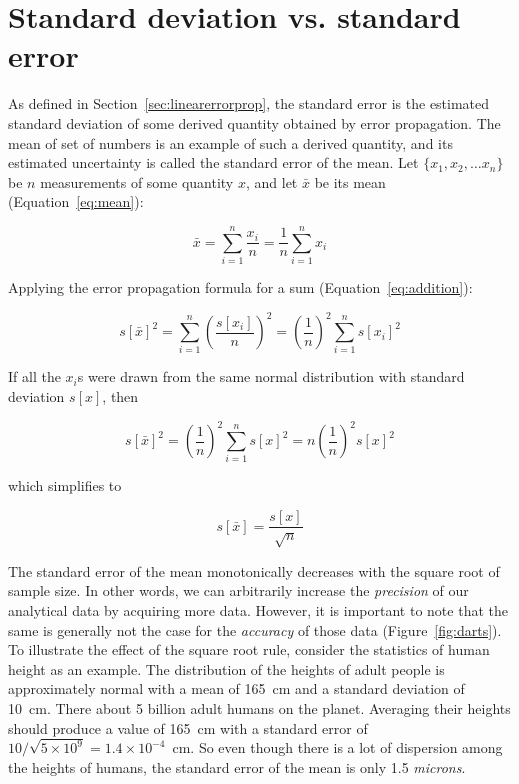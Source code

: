 \section{Standard deviation vs. standard error}
\label{sec:stderr}

As defined in Section~\ref{sec:linearerrorprop}, the standard error is
the estimated standard deviation of some derived quantity obtained by
error propagation. The mean of set of numbers is an example of such a
derived quantity, and its estimated uncertainty is called the standard
error of the mean.  Let $\{x_1,x_2, \ldots x_n\}$ be $n$ measurements
of some quantity $x$, and let $\bar{x}$ be its mean
(Equation~\ref{eq:mean}):

\[
\bar{x} = \sum\limits_{i=1}^n \frac{x_i}{n} = \frac{1}{n} \sum\limits_{i=1}^n x_i
\]

Applying the error propagation formula for a sum
(Equation~\ref{eq:addition}):

\[
s[\bar{x}]^2 = \sum\limits_{i=1}^{n}\left(\frac{s[x_i]}{n}\right)^2 =
\left(\frac{1}{n}\right)^2 \sum\limits_{i=1}^{n}s[x_i]^2
\]

If all the $x_i$s were drawn from the same normal distribution with
standard deviation $s[x]$, then

\[
s[\bar{x}]^2 = \left(\frac{1}{n}\right)^2 \sum\limits_{i=1}^{n}s[x]^2 =
n \left(\frac{1}{n}\right)^2 s[x]^2
\]

\noindent which simplifies to

\begin{equation}
  s[\bar{x}] = \frac{s[x]}{\sqrt{n}}
  \label{eq:stderrmean}
\end{equation}

The standard error of the mean monotonically decreases with the square
root of sample size. In other words, we can arbitrarily increase the
\emph{precision} of our analytical data by acquiring more
data. However, it is important to note that the same is generally not
the case for the \emph{accuracy} of those data
(Figure~\ref{fig:darts}). To illustrate the effect of the square root
rule, consider the statistics of human height as an example.  The
distribution of the heights of adult people is approximately normal
with a mean of 165~cm and a standard deviation of 10~cm. There about 5
billion adult humans on the planet. Averaging their heights should
produce a value of 165~cm with a standard error of
$10/\sqrt{5\times{10}^9} = 1.4\times{10}^{-4}$~cm. So even though
there is a lot of dispersion among the heights of humans, the standard
error of the mean is only 1.5 \emph{microns}.

